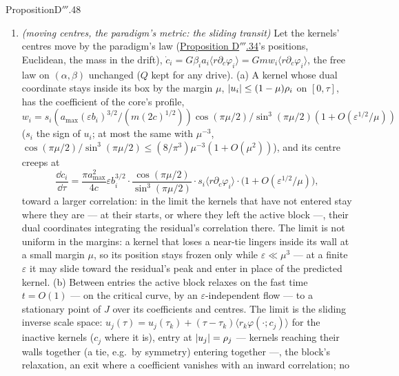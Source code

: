 \begin{thm}{Proposition}{D$'''$.48}
\begin{enumerate}[label=\textup{(\roman*)}]
    (\hyperref[res:thmDppp:47]{D$'''$.47}(iv)) gives the two-sided box with the weights $1/(\gamma a_0)$ ---
    Pesme--Flammarion's depth-2 limit. The rate $1/\log(1/\varepsilon)$ keeps this limit asymptotic: at
    $\varepsilon = 10^{-4}$ the dual is still 40--80\% of the weights away and the entry times are off by more than the
    first entry.
  \item \emph{(moving centres, the paradigm's metric: the sliding transit)} Let the kernels' centres move by the
    paradigm's law (\hyperref[res:thmDppp:34]{Proposition D$'''$.34}'s positions, Euclidean, the mass in the drift),
    $\dot c_i = G\beta_ia_i\langle r\partial_c\varphi_i\rangle = Gmw_i\langle r\partial_c\varphi_i\rangle$, the free law
    on $(\alpha,\beta)$ unchanged ($Q$ kept for any drive). (a) A kernel whose dual coordinate stays inside its box by
    the margin $\mu$, $\lvert u_i\rvert\le(1 - \mu)\rho_i$ on $[0,\tau]$, has the coefficient of the core's profile,
    $w_i = s_i(a_{\max}(\varepsilon b_i)^{3/2}/(m(2c)^{1/2}))\cos(\pi\mu/2)/\sin^3(\pi\mu/2)
    (1 + O(\varepsilon^{1/2}/\mu))$ ($s_i$ the sign of $u_i$; at most the same with $\mu^{-3}$,
    $\cos(\pi\mu/2)/\sin^3(\pi\mu/2)\le(8/\pi^3)\mu^{-3}(1 + O(\mu^2))$), and its centre creeps at
    \[
      \frac{\dd c_i}{\dd\tau} = \frac{\pi a_{\max}^2}{4c}\varepsilon b_i^{3/2}\cdot
      \frac{\cos(\pi\mu/2)}{\sin^3(\pi\mu/2)}\cdot s_i\langle r\partial_c\varphi_i\rangle\cdot
      \big(1 + O(\varepsilon^{1/2}/\mu)\big),
    \]
    toward a larger correlation: in the limit the kernels that have not entered stay where they are --- at their
    starts, or where they left the active block ---, their dual coordinates integrating the residual's correlation
    there. The limit is not uniform in the margins: a kernel that loses a near-tie lingers inside its wall at a small
    margin $\mu$, so its position stays frozen only while $\varepsilon\ll\mu^3$ --- at a finite $\varepsilon$ it may
    slide toward the residual's peak and enter in place of the predicted kernel. (b) Between entries the active block
    relaxes on the fast time $t = O(1)$ --- on the critical curve, by an $\varepsilon$-independent flow --- to a
    stationary point of $J$ over its coefficients and centres. The limit is the sliding inverse scale space:
    $u_j(\tau) = u_j(\tau_k) + (\tau - \tau_k)\langle r_k\varphi(\cdot;c_j)\rangle$ for the inactive kernels ($c_j$
    where it is), entry at $\lvert u_j\rvert = \rho_j$ --- kernels reaching their walls together (a tie, e.g.\ by symmetry)
    entering together ---, the block's relaxation, an exit where a coefficient vanishes with an inward correlation; no

\end{enumerate}
\end{thm}
